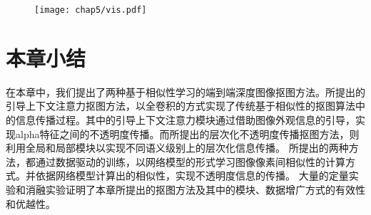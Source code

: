 \begin{figure}[t]
	\centering
	\texttt{[image: chap5/vis.pdf]}
	\label{fig5:vis}
\end{figure}


\section{本章小结}
在本章中，我们提出了两种基于相似性学习的端到端深度图像抠图方法。所提出的引导上下文注意力抠图方法，以全卷积的方式实现了传统基于相似性的抠图算法中的信息传播过程。其中的引导上下文注意力模块通过借助图像外观信息的引导，实现alpha特征之间的不透明度传播。而所提出的层次化不透明度传播抠图方法，则利用全局和局部模块以实现不同语义级别上的层次化信息传播。
所提出的两种方法，都通过数据驱动的训练，以网络模型的形式学习图像像素间相似性的计算方式。并依据网络模型计算出的相似性，实现不透明度信息的传播。
大量的定量实验和消融实验证明了本章所提出的抠图方法及其中的模块、数据增广方式的有效性和优越性。